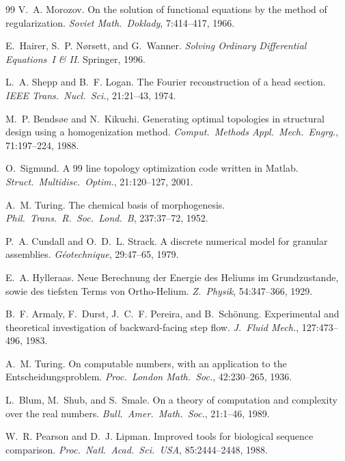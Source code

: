 \documentclass[11pt,a4paper]{article}
\begin{document}
\begin{thebibliography}{99}
V.~A. Morozov. On the solution of functional equations by the method of regularization. \emph{Soviet Math.\ Doklady}, 7:414--417, 1966.

E.~Hairer, S.~P. N{\o}rsett, and G.~Wanner. \emph{Solving Ordinary Differential Equations~I \& II}. Springer, 1996.


L.~A. Shepp and B.~F. Logan. The Fourier reconstruction of a head section. \emph{IEEE Trans.\ Nucl.\ Sci.}, 21:21--43, 1974.

M.~P. Bends{\o}e and N.~Kikuchi. Generating optimal topologies in structural design using a homogenization method. \emph{Comput.\ Methods Appl.\ Mech.\ Engrg.}, 71:197--224, 1988.

O.~Sigmund. A 99 line topology optimization code written in {Matlab}. \emph{Struct.\ Multidisc.\ Optim.}, 21:120--127, 2001.

A.~M. Turing. The chemical basis of morphogenesis. \emph{Phil.\ Trans.\ R.\ Soc.\ Lond.\ B}, 237:37--72, 1952.

P.~A. Cundall and O.~D.~L. Strack. A discrete numerical model for granular assemblies. \emph{G\'eotechnique}, 29:47--65, 1979.

E.~A. Hylleraas. Neue Berechnung der Energie des Heliums im Grundzustande, sowie des tiefsten Terms von Ortho-Helium. \emph{Z.\ Physik}, 54:347--366, 1929.

B.~F. Armaly, F.~Durst, J.~C.~F. Pereira, and B.~Sch{\"o}nung. Experimental and theoretical investigation of backward-facing step flow. \emph{J.\ Fluid Mech.}, 127:473--496, 1983.


A.~M. Turing. On computable numbers, with an application to the {E}ntscheidungsproblem. \emph{Proc.\ London Math.\ Soc.}, 42:230--265, 1936.

L.~Blum, M.~Shub, and S.~Smale. On a theory of computation and complexity over the real numbers. \emph{Bull.\ Amer.\ Math.\ Soc.}, 21:1--46, 1989.


W.~R. Pearson and D.~J. Lipman. Improved tools for biological sequence comparison. \emph{Proc.\ Natl.\ Acad.\ Sci.\ USA}, 85:2444--2448, 1988.


\end{thebibliography}
\end{document}
